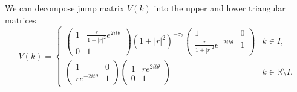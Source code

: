 \documentclass[11pt]{article}
\numberwithin{equation}{section}
\begin{document}
We can decompose jump matrix $V(k)$ into the upper and lower triangular matrices
\begin{equation} \label{234}
V(k)=\left\{\begin{array}{ll}
\left(\begin{array}{cc}1&\frac{r}{1+|r|^2}e^{2it\theta}\\ 0&1\end{array}\right)\left(1+|r|^2\right)^{-\sigma_3}\left(\begin{array}{cc}1&0\\ \frac{\bar{r}}{1+|r|^2}e^{-2it\theta}&1\end{array}\right)
 &k\in I,\\
\left(\begin{array}{cc}1&0\\
\bar{r}e^{-2it\theta}&1\end{array}\right) \left(\begin{array}{cc}1&re^{2it\theta}\\ 0&1\end{array}\right)&k \in \mathbb{R}\setminus I.
\end{array}\right.
\end{equation}
\end{document}
